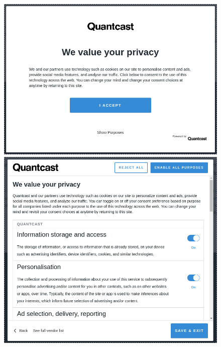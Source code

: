 \begin{figure}[htbp]
    \begin{minipage}[b]{0.5\linewidth}
        \centering
        \includegraphics[width=\linewidth]{img/quantcast_consent_screen.png}
        \vspace{0.35cm}
    \end{minipage}
    \begin{minipage}[b]{0.5\linewidth}
        \centering
        \includegraphics[width=\linewidth]{img/quantcast_consent_I_agree.png}
    \end{minipage}
    \begin{minipage}[b]{0.5\linewidth}

\end{minipage}
\end{figure}
